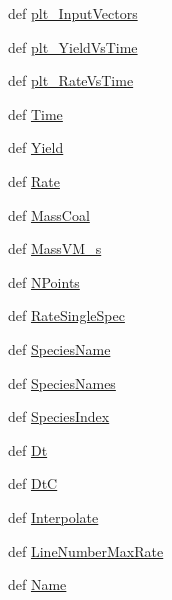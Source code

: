 \begin{DoxyCompactItemize}
\item 
def \hyperlink{classFitInfo_1_1Fit__one__run_a22e0f9b86db5ab17d84594be261b3f51}{plt\-\_\-\-Input\-Vectors}
\item 
def \hyperlink{classFitInfo_1_1Fit__one__run_ac3755b6b7d3074da8a4d1f2351067fab}{plt\-\_\-\-Yield\-Vs\-Time}
\item 
def \hyperlink{classFitInfo_1_1Fit__one__run_a6ef4ec9d1115393618699b035ea91261}{plt\-\_\-\-Rate\-Vs\-Time}
\item 
def \hyperlink{classFitInfo_1_1Fit__one__run_a474ef41cdcd65bdcc6efd3a0f5a69198}{\-Time}
\item 
def \hyperlink{classFitInfo_1_1Fit__one__run_ac4860413bd4693eb247d73ac64eb13be}{\-Yield}
\item 
def \hyperlink{classFitInfo_1_1Fit__one__run_a225bc2b47046a6630571306161005b5f}{\-Rate}
\item 
def \hyperlink{classFitInfo_1_1Fit__one__run_abdd87a5ecd7a9eafbad662dd5052e452}{\-Mass\-Coal}
\item 
def \hyperlink{classFitInfo_1_1Fit__one__run_af046e7caf8d696baaab86d7fb8d383ba}{\-Mass\-V\-M\-\_\-s}
\item 
def \hyperlink{classFitInfo_1_1Fit__one__run_a18e4a09e916eaab49875d4896806856e}{\-N\-Points}
\item 
def \hyperlink{classFitInfo_1_1Fit__one__run_a1d6a28dfe2ebc03db22b2f13941f8d6f}{\-Rate\-Single\-Spec}
\item 
def \hyperlink{classFitInfo_1_1Fit__one__run_a7d9de59d382b05d6e5f2998fd30eecd7}{\-Species\-Name}
\item 
def \hyperlink{classFitInfo_1_1Fit__one__run_aa86320414c2a97015418ab420e22b03d}{\-Species\-Names}
\item 
def \hyperlink{classFitInfo_1_1Fit__one__run_a009992fd630296ced088620aa3cde5d1}{\-Species\-Index}
\item 
def \hyperlink{classFitInfo_1_1Fit__one__run_a62a341421070dbd08579d07dc455cb83}{\-Dt}
\item 
def \hyperlink{classFitInfo_1_1Fit__one__run_a3a0ca5c2c4ed469e6419848826ed5afa}{\-Dt\-C}
\item 
def \hyperlink{classFitInfo_1_1Fit__one__run_a5000d9d5386ef7f1308f012a7b0f548d}{\-Interpolate}
\item 
def \hyperlink{classFitInfo_1_1Fit__one__run_ab39578a2d9e1295264ecfe29803902f1}{\-Line\-Number\-Max\-Rate}
\item 
def \hyperlink{classFitInfo_1_1Fit__one__run_a3ea2c81143ec30d52e1a3989136da50d}{\-Name}
\end{DoxyCompactItemize}
